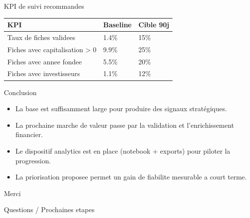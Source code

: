 \documentclass[aspectratio=169]{beamer}
\begin{document}
\begin{frame}{KPI de suivi recommandes}
\begin{table}
\centering
\begin{tabular}{lll}
\toprule
KPI & Baseline & Cible 90j \\
\midrule
Taux de fiches validees & 1.4\% & 15\% \\
Fiches avec capitalisation > 0 & 9.9\% & 25\% \\
Fiches avec annee fondee & 5.5\% & 20\% \\
Fiches avec investisseurs & 1.1\% & 12\% \\
\bottomrule
\end{tabular}
\end{table}
\end{frame}

\begin{frame}{Conclusion}
\begin{itemize}
  \item La base est suffisamment large pour produire des signaux strat\'egiques.
  \item La prochaine marche de valeur passe par la validation et l'enrichissement financier.
  \item Le dispositif analytics est en place (notebook + exports) pour piloter la progression.
  \item La priorisation proposee permet un gain de fiabilite mesurable a court terme.
\end{itemize}
\end{frame}

\begin{frame}
\centering
\Large Merci

\vspace{0.5em}
\normalsize
Questions / Prochaines etapes
\end{frame}
\end{document}
